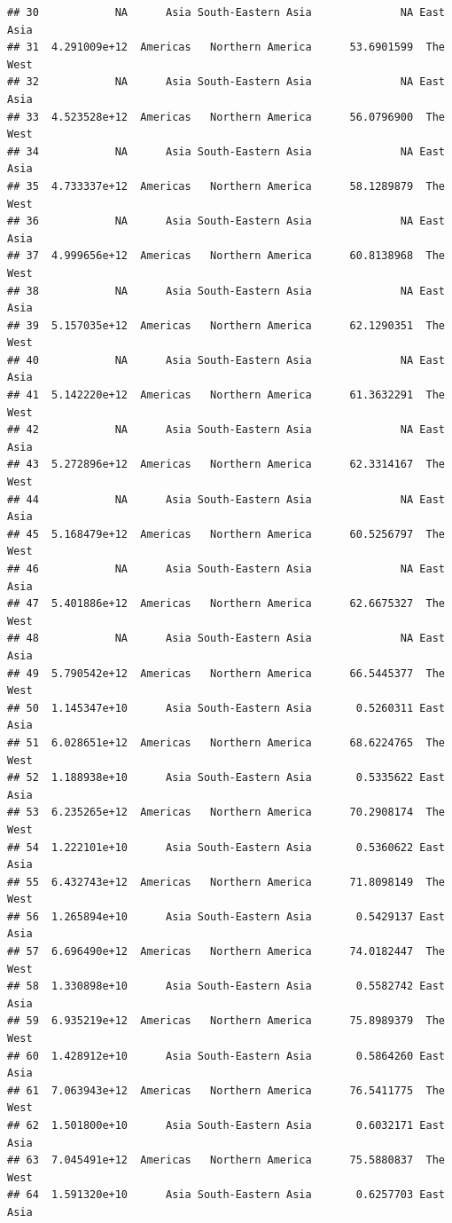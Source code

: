 \documentclass[
]{article}
\begin{document}
\begin{verbatim}
## 30            NA      Asia South-Eastern Asia              NA East Asia
## 31  4.291009e+12  Americas   Northern America      53.6901599  The West
## 32            NA      Asia South-Eastern Asia              NA East Asia
## 33  4.523528e+12  Americas   Northern America      56.0796900  The West
## 34            NA      Asia South-Eastern Asia              NA East Asia
## 35  4.733337e+12  Americas   Northern America      58.1289879  The West
## 36            NA      Asia South-Eastern Asia              NA East Asia
## 37  4.999656e+12  Americas   Northern America      60.8138968  The West
## 38            NA      Asia South-Eastern Asia              NA East Asia
## 39  5.157035e+12  Americas   Northern America      62.1290351  The West
## 40            NA      Asia South-Eastern Asia              NA East Asia
## 41  5.142220e+12  Americas   Northern America      61.3632291  The West
## 42            NA      Asia South-Eastern Asia              NA East Asia
## 43  5.272896e+12  Americas   Northern America      62.3314167  The West
## 44            NA      Asia South-Eastern Asia              NA East Asia
## 45  5.168479e+12  Americas   Northern America      60.5256797  The West
## 46            NA      Asia South-Eastern Asia              NA East Asia
## 47  5.401886e+12  Americas   Northern America      62.6675327  The West
## 48            NA      Asia South-Eastern Asia              NA East Asia
## 49  5.790542e+12  Americas   Northern America      66.5445377  The West
## 50  1.145347e+10      Asia South-Eastern Asia       0.5260311 East Asia
## 51  6.028651e+12  Americas   Northern America      68.6224765  The West
## 52  1.188938e+10      Asia South-Eastern Asia       0.5335622 East Asia
## 53  6.235265e+12  Americas   Northern America      70.2908174  The West
## 54  1.222101e+10      Asia South-Eastern Asia       0.5360622 East Asia
## 55  6.432743e+12  Americas   Northern America      71.8098149  The West
## 56  1.265894e+10      Asia South-Eastern Asia       0.5429137 East Asia
## 57  6.696490e+12  Americas   Northern America      74.0182447  The West
## 58  1.330898e+10      Asia South-Eastern Asia       0.5582742 East Asia
## 59  6.935219e+12  Americas   Northern America      75.8989379  The West
## 60  1.428912e+10      Asia South-Eastern Asia       0.5864260 East Asia
## 61  7.063943e+12  Americas   Northern America      76.5411775  The West
## 62  1.501800e+10      Asia South-Eastern Asia       0.6032171 East Asia
## 63  7.045491e+12  Americas   Northern America      75.5880837  The West
## 64  1.591320e+10      Asia South-Eastern Asia       0.6257703 East Asia

\end{verbatim}
\end{document}
